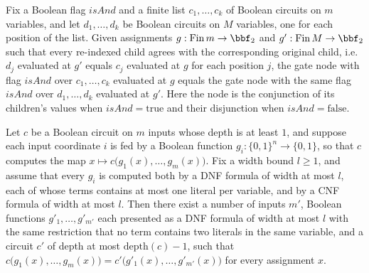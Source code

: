 \begin{lemma}
\label{LMN.node_eval_eq_of_finRange_map}
\leanok
{}
Fix a Boolean flag $\mathit{isAnd}$ and a finite list $c_1,\dots,c_k$ of Boolean
circuits on $m$ variables, and let $d_1,\dots,d_k$ be Boolean circuits on $M$ variables,
one for each position of the list. Given assignments $g : \mathrm{Fin}\,m \to \bbf_2$
and $g' : \mathrm{Fin}\,M \to \bbf_2$ such that every re-indexed child agrees with the
corresponding original child, i.e. $d_j$ evaluated at $g'$ equals $c_j$ evaluated at $g$
for each position $j$, the gate node with flag $\mathit{isAnd}$ over $c_1,\dots,c_k$
evaluated at $g$ equals the gate node with the same flag $\mathit{isAnd}$ over
$d_1,\dots,d_k$ evaluated at $g'$. Here the node is the conjunction of its children's
values when $\mathit{isAnd} = \mathrm{true}$ and their disjunction when $\mathit{isAnd}
= \mathrm{false}$.
\end{lemma}

\begin{lemma}
\label{LMN.exists_circuit_depth_reduction}
\leanok
{}
Let $c$ be a Boolean circuit on $m$ inputs whose depth is at least $1$, and suppose each
input coordinate $i$ is fed by a Boolean function $g_i \colon \{0,1\}^n \to \{0,1\}$, so
that $c$ computes the map $x \mapsto c\bigl(g_1(x),\dots,g_m(x)\bigr)$. Fix a width
bound $l \ge 1$, and assume that every $g_i$ is computed both by a DNF formula of width
at most $l$, each of whose terms contains at most one literal per variable, and by a CNF
formula of width at most $l$. Then there exist a number of inputs $m'$, Boolean
functions $g'_1,\dots,g'_{m'}$ each presented as a DNF formula of width at most $l$ with
the same restriction that no term contains two literals in the same variable, and a
circuit $c'$ of depth at most $\mathrm{depth}(c) - 1$, such that
$c\bigl(g_1(x),\dots,g_m(x)\bigr) = c'\bigl(g'_1(x),\dots,g'_{m'}(x)\bigr)$ for every
assignment $x$.
\end{lemma}

